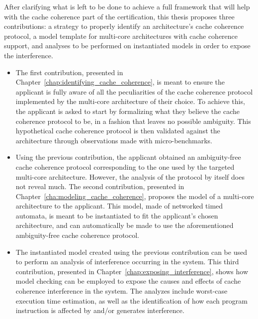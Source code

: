 After clarifying what is left to be done to achieve a full framework that will
help with the cache coherence part of the certification, this thesis proposes
three contributions: a strategy to properly identify an architecture's cache
coherence protocol, a model template for multi-core architectures with cache
coherence support, and analyses to be performed on instantiated models in order
to expose the interference.
\begin{itemize}
\item
The first contribution, presented in
Chapter~\ref{chap:identifying_cache_coherence}, is meant to ensure the
applicant is fully aware of all the peculiarities of the cache coherence
protocol implemented by the multi-core architecture of their choice. To achieve
this, the applicant is asked to start by formalizing what they believe the
cache coherence protocol to be, in a fashion that leaves no possible ambiguity.
This hypothetical cache coherence protocol is then validated against the
architecture through observations made with micro-benchmarks.

\item
Using the previous contribution, the applicant obtained an ambiguity-free cache
coherence protocol corresponding to the one used by the targeted multi-core
architecture. However, the analysis of the protocol by itself does not reveal
much. The second contribution, presented in
Chapter~\ref{cha:modeling_cache_coherence}, proposes the model of a multi-core
architecture to the applicant. This model, made of networked timed automata, is
meant to be instantiated to fit the applicant's chosen architecture, and can
automatically be made to use the aforementioned ambiguity-free cache coherence
protocol.

\item
The instantiated model created using the previous contribution can be used to
perform an analysis of interference occurring in the system. This third
contribution, presented in Chapter~\ref{chap:exposing_interference}, shows how
model checking can be employed to expose the causes and effects of cache
coherence interference in the system. The analyzes include worst-case execution
time estimation, as well as the identification of how each program instruction
is affected by and/or generates interference.
\end{itemize}

